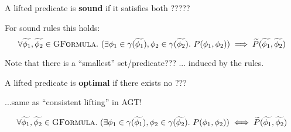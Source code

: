 \begin{definition}
    A lifted predicate is \textbf{sound} if it satisfies both ?????
\end{definition}

For sound rules this holds:
\begin{displaymath}
\forall \widetilde{\phi_1}, \widetilde{\phi_2} \in \textsc{GFormula}.~ (\exists \phi_1 \in \gamma(\widetilde{\phi_1}), \phi_2 \in \gamma(\widetilde{\phi_2}).~ P(\phi_1, \phi_2)) \implies \widetilde{P}(\widetilde{\phi_1}, \widetilde{\phi_2})
\end{displaymath}

Note that there is a “smallest” set/predicate??? ... induced by the rules.

\begin{definition}
    A lifted predicate is \textbf{optimal} if there exists no ???
\end{definition}

...same as “consistent lifting” in AGT!

\begin{displaymath}
\forall \widetilde{\phi_1}, \widetilde{\phi_2} \in \textsc{GFormula}.~ (\exists \phi_1 \in \gamma(\widetilde{\phi_1}), \phi_2 \in \gamma(\widetilde{\phi_2}).~ P(\phi_1, \phi_2)) \iff \widetilde{P}(\widetilde{\phi_1}, \widetilde{\phi_2})
\end{displaymath}





